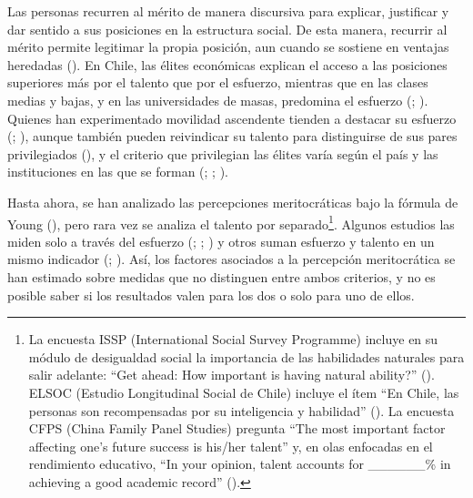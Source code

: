 \documentclass[
  spanish,
  a4paper,
  oneside]{scrbook}
\begin{document}
Las personas recurren al mérito de manera discursiva para explicar,
justificar y dar sentido a sus posiciones en la estructura social. De
esta manera, recurrir al mérito permite legitimar la propia posición,
aun cuando se sostiene en ventajas heredadas
(). En
Chile, las élites económicas explican el acceso a las posiciones
superiores más por el talento que por el esfuerzo, mientras que en las
clases medias y bajas, y en las universidades de masas, predomina el
esfuerzo (; ). Quienes han experimentado movilidad ascendente
tienden a destacar su esfuerzo (; ),
aunque también pueden reivindicar su talento para distinguirse de sus
pares privilegiados (), y el criterio que privilegian las élites varía según el país y
las instituciones en las que se forman
(;
;
).

Hasta ahora, se han analizado las percepciones meritocráticas bajo la
fórmula de Young (), pero rara vez se
analiza el talento por separado\footnote{La encuesta ISSP (International
  Social Survey Programme) incluye en su módulo de desigualdad social la
  importancia de las habilidades naturales para salir adelante: ``Get
  ahead: How important is having natural ability?''
  (). ELSOC (Estudio
  Longitudinal Social de Chile) incluye el ítem ``En Chile, las personas
  son recompensadas por su inteligencia y habilidad''
  (). La encuesta CFPS (China
  Family Panel Studies) pregunta ``The most important factor affecting
  one's future success is his/her talent'' y, en olas enfocadas en el
  rendimiento educativo, ``In your opinion, talent accounts for
  \_\_\_\_\_\_\% in achieving a good academic record''
  ().}. Algunos estudios las miden solo a través del
esfuerzo (;
;
) y otros
suman esfuerzo y talento en un mismo indicador
(;
). Así, los factores asociados a la percepción meritocrática se han
estimado sobre medidas que no distinguen entre ambos criterios, y no es
posible saber si los resultados valen para los dos o solo para uno de
ellos.
\end{document}
